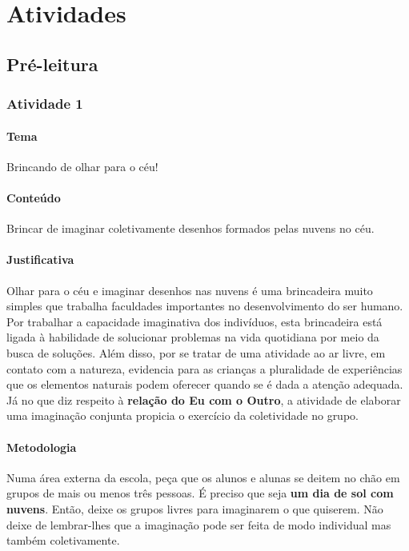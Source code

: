 \documentclass[11pt]{extarticle}
\begin{document}
\section{Atividades}

\subsection{Pré-leitura}


\subsubsection{Atividade 1}

\paragraph{Tema} Brincando de olhar para o céu!

\paragraph{Conteúdo} Brincar de imaginar coletivamente desenhos formados pelas nuvens no céu.

\paragraph{Justificativa} Olhar para o céu e imaginar desenhos nas nuvens é uma brincadeira muito 
simples que trabalha faculdades importantes no desenvolvimento do ser humano. Por trabalhar a capacidade 
imaginativa dos indivíduos, esta brincadeira está ligada à habilidade de solucionar problemas
na vida quotidiana por meio da busca de soluções. Além disso, por se tratar de uma atividade ao ar livre,
em contato com a natureza, evidencia para as crianças a pluralidade de experiências que 
os elementos naturais podem oferecer quando se é dada a atenção adequada. 
Já no que diz respeito à \textbf{relação do Eu com o Outro}, a atividade de elaborar uma imaginação conjunta
propicia o exercício da coletividade no grupo.

\paragraph{Metodologia} Numa área externa da escola, peça que os alunos e alunas
se deitem no chão em grupos de mais ou menos três pessoas. 
É preciso que seja \textbf{um dia de sol com nuvens}.
Então, deixe os grupos livres para imaginarem o que quiserem.
Não deixe de lembrar-lhes que a imaginação pode ser feita de modo
individual mas também coletivamente. 
\end{document}
